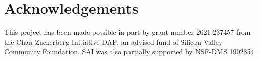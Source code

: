 \documentclass{juliacon}
\numberwithin{equation}{section}
\begin{document}
\section{Acknowledgements}
This project has been made possible in part by grant number 2021-237457 from the Chan Zuckerberg Initiative DAF, an advised fund of Silicon Valley Community Foundation. SAI was also partially supported by NSF-DMS 1902854.



\end{document}
